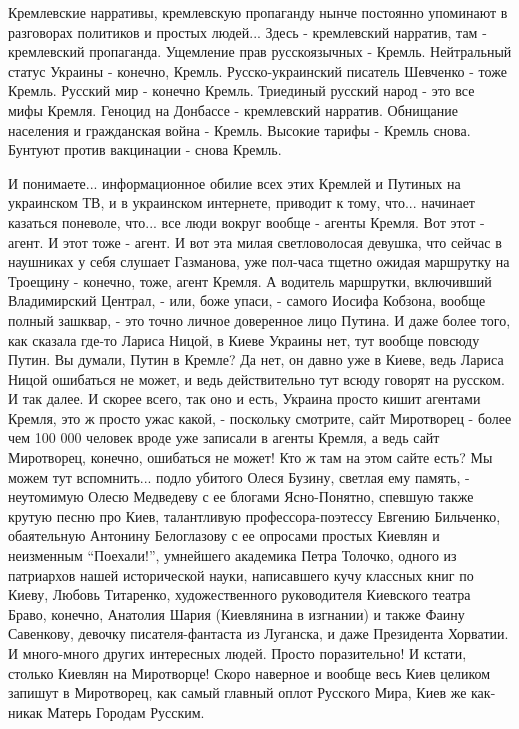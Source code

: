 Кремлевские нарративы, кремлевскую пропаганду нынче постоянно упоминают в разговорах политиков и
простых людей... Здесь - кремлевский нарратив, там - кремлевский пропаганда.
Ущемление прав русскоязычных - Кремль. Нейтральный статус Украины - конечно,
Кремль. Русско-украинский писатель Шевченко - тоже Кремль. Русский мир -
конечно Кремль. Триединый русский народ - это все мифы Кремля. Геноцид на
Донбассе - кремлевский нарратив. Обнищание населения и гражданская война -
Кремль. Высокие тарифы - Кремль снова. Бунтуют против вакцинации - снова
Кремль.

И понимаете... информационное обилие всех этих Кремлей и Путиных на украинском
ТВ, и в украинском интернете, приводит к тому, что... начинает казаться
поневоле, что... все люди вокруг вообще - агенты Кремля. Вот этот - агент. И
этот тоже - агент. И вот эта милая светловолосая девушка, что сейчас в
наушниках у себя слушает Газманова, уже пол-часа тщетно ожидая маршрутку на
Троещину - конечно, тоже, агент Кремля. А водитель маршрутки, включивший
Владимирский Централ, - или, боже упаси, - самого Иосифа Кобзона, вообще полный
зашквар, - это точно личное доверенное лицо Путина. И даже более того, как
сказала где-то Лариса Ницой, в Киеве Украины нет, тут вообще повсюду Путин. Вы
думали, Путин в Кремле? Да нет, он давно уже в Киеве, ведь Лариса Ницой
ошибаться не может, и ведь действительно тут всюду говорят на русском. И так
далее. И скорее всего, так оно и есть, Украина просто кишит агентами Кремля,
это ж просто ужас какой, - поскольку смотрите, сайт Миротворец - более чем 100
000  человек вроде уже записали в агенты Кремля, а ведь сайт Миротворец,
конечно, ошибаться не может!  Кто ж там на этом сайте есть? Мы можем тут
вспомнить... подло убитого Олеся Бузину, светлая ему память, - неутомимую Олесю
Медведеву с ее блогами Ясно-Понятно, спевшую также крутую песню про Киев,
талантливую профессора-поэтессу Евгению Бильченко, обаятельную Антонину
Белоглазову с ее опросами простых Киевлян и неизменным \enquote{Поехали!},
умнейшего академика Петра Толочко, одного из патриархов нашей исторической
науки, написавшего кучу классных книг по Киеву, Любовь Титаренко,
художественного руководителя Киевского театра Браво, конечно, Анатолия Шария
(Киевлянина в изгнании) и также Фаину Савенкову, девочку писателя-фантаста из
Луганска, и даже Президента Хорватии. И много-много других интересных людей.
Просто поразительно!  И кстати, столько Киевлян на Миротворце! Скоро наверное и
вообще весь Киев целиком запишут в Миротворец, как самый главный оплот Русского
Мира, Киев же как-никак Матерь Городам Русским.

